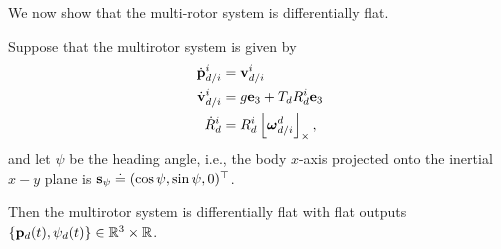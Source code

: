 We now show that the multi-rotor system is differentially flat.

\begin{theorem}

Suppose that the multirotor system is given by
\begin{align}
\dot{\pbf}_{d/i}^i &= \vbf_{d/i}^i \label{eq:flat-multirotor-1} \\
\dot{\vbf}_{d/i}^i &= g \ebf_3 + T_d R_d^i \ebf_3 \label{eq:flat-multirotor-2} \\
\dot{R}_d^i &= R_d^i \ss{\omegabf_{d/i}^d}, \label{eq:flat-multirotor-3}
\end{align}
and let $\psi$ be the heading angle, i.e., the body $x$-axis projected onto the inertial $x-y$ plane is 
$\mathbf{s}_\psi\doteq (\cos\psi, \sin\psi, 0)^\top$.  

Then the multirotor system is differentially flat with flat outputs $\{\mathbf{p}_d(t), \psi_d(t)\} \in\mathbb{R}^3 \times \mathbb{R}$.
\end{theorem}
